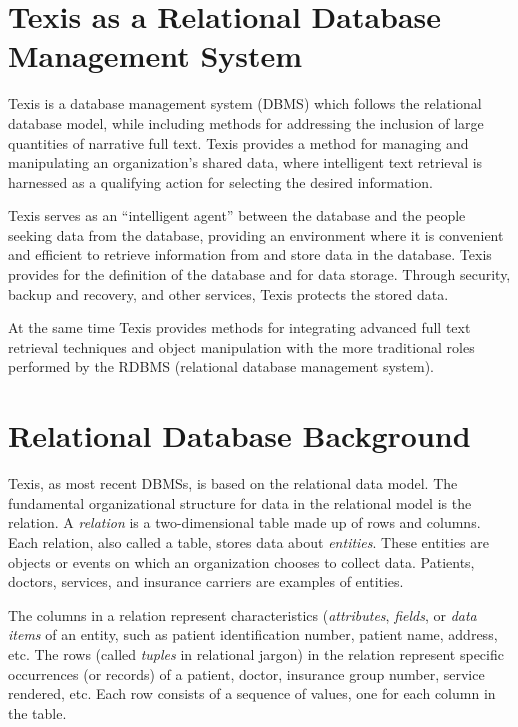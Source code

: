 \section{Texis as a Relational Database Management System}

Texis is a database management system (DBMS) which follows the
relational database model, while including methods for addressing the
inclusion of large quantities of narrative full text.  Texis provides
a method for managing and manipulating an organization's shared data,
where intelligent text retrieval is harnessed as a qualifying action
for selecting the desired information.

Texis serves as an ``intelligent agent'' between the database and the
people seeking data from the database, providing an environment where
it is convenient and efficient to retrieve information from and store
data in the database.  Texis provides for the definition of the
database and for data storage.  Through security, backup and recovery,
and other services, Texis protects the stored data.

At the same time Texis provides methods for integrating advanced full
text retrieval techniques and object manipulation with the more
traditional roles performed by the RDBMS (relational database
management system).

\section{Relational Database Background}

Texis, as most recent DBMSs, is based on the relational data model.
The fundamental organizational structure for data in the relational
model is the relation.  A {\em relation} is a two-dimensional table
made up of rows and columns.  Each relation, also called a table,
stores data about {\em entities}.  These entities are objects or
events on which an organization chooses to collect data.  Patients,
doctors, services, and insurance carriers are examples of entities.

The columns in a relation represent characteristics ({\em attributes},
{\em fields}, or {\em data items} of an entity, such as patient
identification number, patient name, address, etc.  The rows (called
{\em tuples} in relational jargon) in the relation represent specific
occurrences (or records) of a patient, doctor, insurance group number,
service rendered, etc.  Each row consists of a sequence of values, one
for each column in the table.


